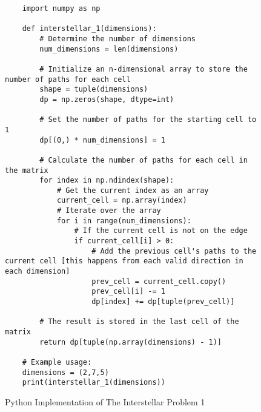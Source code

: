 \begin{figure}[H]
    \centering
    \begin{lstlisting}
    import numpy as np

    def interstellar_1(dimensions):
        # Determine the number of dimensions
        num_dimensions = len(dimensions)
    
        # Initialize an n-dimensional array to store the number of paths for each cell
        shape = tuple(dimensions)
        dp = np.zeros(shape, dtype=int)
    
        # Set the number of paths for the starting cell to 1
        dp[(0,) * num_dimensions] = 1
    
        # Calculate the number of paths for each cell in the matrix
        for index in np.ndindex(shape):
            # Get the current index as an array
            current_cell = np.array(index)
            # Iterate over the array
            for i in range(num_dimensions):
                # If the current cell is not on the edge
                if current_cell[i] > 0:
                    # Add the previous cell's paths to the current cell [this happens from each valid direction in each dimension]
                    prev_cell = current_cell.copy()
                    prev_cell[i] -= 1
                    dp[index] += dp[tuple(prev_cell)]
    
        # The result is stored in the last cell of the matrix
        return dp[tuple(np.array(dimensions) - 1)]
    
    # Example usage:
    dimensions = (2,7,5)
    print(interstellar_1(dimensions))
    \end{lstlisting}
    \caption{Python Implementation of The Interstellar Problem 1}
    \label{fig:nd-unique-paths}
\end{figure}


